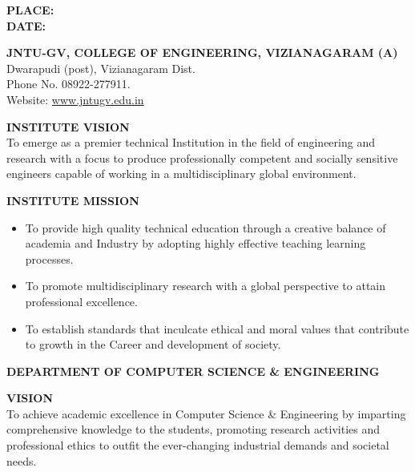 \documentclass[12pt,a4paper]{report}
\begin{document}
\vspace{1.5cm}
\noindent
\textbf{PLACE:}\\
\textbf{DATE:}

\newpage
\begin{center}
    \large{\textbf{JNTU-GV, COLLEGE OF ENGINEERING, VIZIANAGARAM (A)}}\\
    \normalsize{Dwarapudi (post), Vizianagaram Dist.}\\
    \normalsize{Phone No. 08922-277911.}\\
    \normalsize{Website: \href{http://www.jntugv.edu.in}{www.jntugv.edu.in}}
\end{center}

\vspace{1cm}
\noindent
\textbf{INSTITUTE VISION}\\
To emerge as a premier technical Institution in the field of engineering and research with a focus to produce professionally competent and socially sensitive engineers capable of working in a multidisciplinary global environment.

\vspace{0.5cm}
\noindent
\textbf{INSTITUTE MISSION}
\begin{itemize}[leftmargin=*]
    \setlength\itemsep{0.1em}
    \item To provide high quality technical education through a creative balance of academia and Industry by adopting highly effective teaching learning processes.
    \item To promote multidisciplinary research with a global perspective to attain professional excellence.
    \item To establish standards that inculcate ethical and moral values that contribute to growth in the Career and development of society.
\end{itemize}

\vspace{1cm}

\begin{center}
    \large{\textbf{DEPARTMENT OF COMPUTER SCIENCE \& ENGINEERING}}
\end{center}

\vspace{0.5cm}
\noindent
\textbf{VISION}\\
To achieve academic excellence in Computer Science \& Engineering by imparting comprehensive knowledge to the students, promoting research activities and professional ethics to outfit the ever-changing industrial demands and societal needs.
\end{document}
